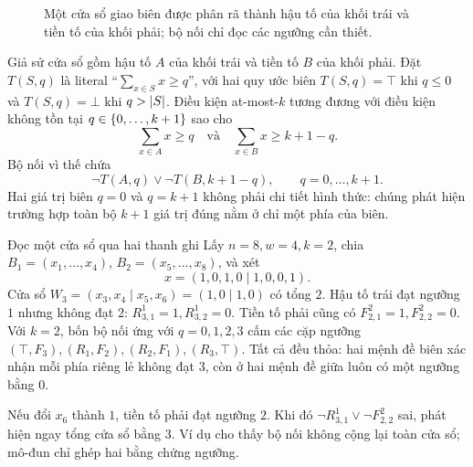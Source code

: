 \begin{figure}[tb]
\centering
{}
\caption{Một cửa sổ giao biên được phân rã thành hậu tố của khối trái và tiền tố
của khối phải; bộ nối chỉ đọc các ngưỡng cần thiết.}
\label{fig:block-connector}
\end{figure}

\begin{example}
Giả sử cửa sổ gồm hậu tố \(A\) của khối trái và tiền tố \(B\) của khối phải.
Đặt \(T(S,q)\) là literal ``\(\sum_{x\in S}x\ge q\)'', với hai quy ước biên
\(T(S,q)=\top\) khi \(q\le 0\) và \(T(S,q)=\bot\) khi \(q>\lvert S\rvert\).
Điều kiện at-most-\(k\) tương đương với điều kiện không tồn tại
\(q\in\left\{0,\ldots,k+1\right\}\) sao cho
\[
  \sum_{x\in A}x\ge q
  \quad\text{và}\quad
  \sum_{x\in B}x\ge k+1-q.
\]
Bộ nối vì thế chứa
\[
  \neg T(A,q)
  \lor
  \neg T(B,k+1-q),
  \qquad q=0,\ldots,k+1.
\]
Hai giá trị biên \(q=0\) và \(q=k+1\) không phải chi tiết hình thức: chúng
phát hiện trường hợp toàn bộ \(k+1\) giá trị đúng nằm ở chỉ một phía của biên.
\end{example}

\begin{workedexample}{Đọc một cửa sổ qua hai thanh ghi}
Lấy \(n=8,w=4,k=2\), chia
\(B_1=(x_1,\ldots,x_4)\), \(B_2=(x_5,\ldots,x_8)\), và xét
\[
  x=(1,0,1,0\mid 1,0,0,1).
\]
Cửa sổ \(W_3=(x_3,x_4\mid x_5,x_6)=(1,0\mid1,0)\) có tổng \(2\).
Hậu tố trái đạt ngưỡng \(1\) nhưng không đạt \(2\):
\(R^1_{3,1}=1,R^1_{3,2}=0\). Tiền tố phải cũng có
\(F^2_{2,1}=1,F^2_{2,2}=0\). Với \(k=2\), bốn bộ nối ứng với
\(q=0,1,2,3\) cấm các cặp ngưỡng
\((\top,F_3),(R_1,F_2),(R_2,F_1),(R_3,\top)\).
Tất cả đều thỏa: hai mệnh đề biên xác nhận mỗi phía riêng lẻ không đạt \(3\),
còn ở hai mệnh đề giữa luôn có một ngưỡng bằng \(0\).

Nếu đổi \(x_6\) thành \(1\), tiền tố phải đạt ngưỡng \(2\). Khi đó
\(\neg R^1_{3,1}\lor\neg F^2_{2,2}\) sai, phát hiện ngay tổng cửa sổ bằng
\(3\). Ví dụ cho thấy bộ nối không cộng lại toàn cửa sổ; mô-đun chỉ ghép hai
bằng chứng ngưỡng.
\end{workedexample}

